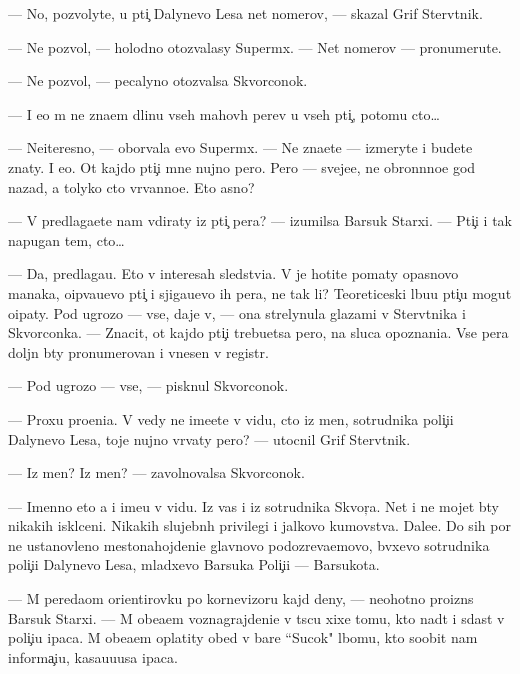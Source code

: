 \documentclass[12pt]{book}
\begin{document}
— No, pozvolyte, u pti{\c} Dalynevo Lesa net nomerov, — skazal Grif Sterv{\ia}tnik.

— Ne pozvol{\io}, — holodno otozvalasy Superm{\yi}x. — Net nomerov — pronumeru{\y}te.

— Ne pozvol{\io}, — pecalyno otozvalsa Skvorconok.

— I {\y}e{\x}o m{\yi} ne zna{\y}em dlinu vseh mahov{\yi}h per{\y}ev u vseh pti{\c}, potomu cto…

— Neiteresno, — oborvala {\y}evo Superm{\yi}x. — Ne zna{\y}ete — izmeryte i budete znaty. I {\y}e{\x}o. Ot kajdo{\y} pti{\c}i mne nujno pero. Pero — sveje{\y}e, ne obron{\e}nno{\y}e god nazad, a tolyko cto v{\yi}rvanno{\y}e. Eto {\y}asno?

— V{\yi} predlaga{\y}ete nam v{\yi}diraty iz pti{\c} per{\y}a? — izumilsa Barsuk Starxi{\y}. — Pti{\c}i i tak napugan{\yi} tem, cto…

— Da, predlaga{\y}u. Eto v interesah sledstvi{\y}a. V{\yi} je hotite po{\y}maty opasnovo man{\y}aka, o{\x}ip{\yi}va{\y}u{\x}evo pti{\c} i sjiga{\y}u{\x}evo ih per{\y}a, ne tak li? Teoreticeski l{\io}bu{\y}u pti{\c}u mogut o{\x}ipaty. Pod ugrozo{\y} — vse, daje v{\yi}, — ona strelynula glaza\-mi v Sterv{\ia}tnika i Skvorconka. — Znacit, ot kajdo{\y} pti{\c}i trebu{\y}etsa pero, na sluca{\y} opoznani{\y}a. Vse per{\y}a doljn{\yi} b{\yi}ty pronumerovan{\yi} i vnesen{\yi} v registr.

— Pod ugrozo{\y} — vse, — pisknul Skvorconok.

— Proxu pro{\x}eni{\y}a. V{\yi} vedy ne ime{\y}ete v vidu, cto iz men{\ia}, sotrudnika poli{\c}i{\y}i Dalynevo Lesa, toje nujno v{\yi}rvaty pero? — utocnil Grif Sterv{\ia}tnik.

— Iz men{\ia}? Iz men{\ia}? — zavolnovalsa Skvorconok.

— Imenno eto {\y}a i ime{\y}u v vidu. Iz vas i iz sotrudnika Skvor{\c}a. Net i ne mojet b{\yi}ty nikakih iskl{\io}ceni{\y}. Nikakih slujebn{\yi}h privilegi{\y} i jalkovo kumovstva. Dale{\y}e. Do sih por ne ustanovleno mestonahojdeni{\y}e glavnovo podozreva{\y}emovo, b{\yi}vxevo sotrudnika poli{\c}i{\y}i Dalynevo Lesa, mladxevo Barsuka Poli{\c}i{\y}i — Barsukota.

— M{\yi} pereda{\y}om orientirovku po kornevizoru kajd{\yi}{\y} deny, — neohotno proizn{\e}s Barsuk Starxi{\y}. — M{\yi} obe{\x}a{\y}em voznagrajdeni{\y}e v t{\yi}s{\ia}cu xixe{\y} tomu, kto na{\y}d{\e}t i sdast v poli{\c}i{\y}u {\X}ipaca. M{\yi} obe{\x}a{\y}em oplatity obed v bare ``Sucok" l{\io}bomu, kto soob{\x}it nam informa{\c}i{\y}u, kasa{\y}u{\x}u{\y}usa {\X}ipaca.
\end{document}
